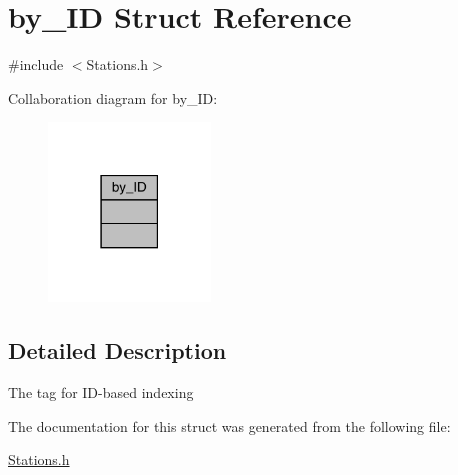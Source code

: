 \hypertarget{structby___i_d}{}\section{by\+\_\+\+ID Struct Reference}
\label{structby___i_d}


{\ttfamily \#include $<$Stations.\+h$>$}



Collaboration diagram for by\+\_\+\+ID\+:
\nopagebreak
\begin{figure}[H]
\begin{center}
\leavevmode
\includegraphics[width=122pt]{structby___i_d__coll__graph}
\end{center}
\end{figure}


\subsection{Detailed Description}
The tag for I\+D-\/based indexing 

The documentation for this struct was generated from the following file\+:\begin{DoxyCompactItemize}
\item 
\mbox{\hyperlink{_stations_8h}{Stations.\+h}}\end{DoxyCompactItemize}
